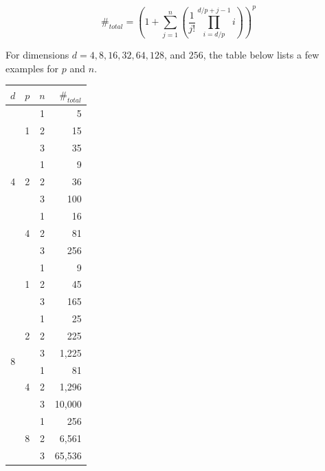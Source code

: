\documentclass{article}
\numberwithin{equation}{section} %
\begin{document}
\begin{equation}
  \#_{total} = \left(1 + \sum_{j=1}^n \left(\frac{1}{j!} \prod_{i=d/p}^{d/p +j-1} i \right) \right)^p
\end{equation}

For dimensions $d = 4, 8, 16, 32, 64, 128$, and $256$, the table below lists a few examples for $p$ and $n$.

\begingroup \renewcommand{\arraystretch}{1.3} %
\quad \quad \quad
\begin{tabular}{c|c|c|r}
  $d$                & $p$              & $n$ & $\#_{total}$ \\ \hline
  \multirow{9}{*}{4} & \multirow{3}{*}{1} & 1 &   5 \\
                     &                    & 2 &  15 \\
                     &                    & 3 &  35 \\ \cline{2-4}
                     & \multirow{3}{*}{2} & 1 &   9 \\
                     &                    & 2 &  36 \\
                     &                    & 3 & 100 \\ \cline{2-4}
                     & \multirow{3}{*}{4} & 1 &  16 \\
                     &                    & 2 &  81 \\
                     &                    & 3 & 256 \\ \hline
  \multirow{12}{*}{8}& \multirow{3}{*}{1} & 1 &      9 \\
                     &                    & 2 &     45 \\
                     &                    & 3 &    165 \\ \cline{2-4}
                     & \multirow{3}{*}{2} & 1 &     25 \\
                     &                    & 2 &    225 \\
                     &                    & 3 &  1,225 \\ \cline{2-4}
                     & \multirow{3}{*}{4} & 1 &     81 \\
                     &                    & 2 &  1,296 \\
                     &                    & 3 & 10,000 \\ \cline{2-4}
                     & \multirow{3}{*}{8} & 1 &    256 \\
                     &                    & 2 &  6,561 \\
                     &                    & 3 & 65,536 \\ \hline
\end{tabular}
\end{document}
